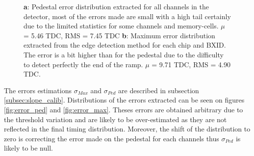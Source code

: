 \documentclass[twoside,a4paper,11pt]{article}
\begin{document}
\begin{appendix}
\begin{figure}[htbp]
	\hfill
	\caption[]{\textbf{a}: Pedestal error distribution extracted for all channels in the detector, most of the errors made are small with a high tail certainly due to the limited statistics for some channels and memory-cells. $\mu$ = 5.46 TDC, RMS = 7.45 TDC \textbf{b}: Maximum error distribution extracted from the edge detection method for each chip and BXID. The error is a bit higher than for the pedestal due to the difficulty to detect perfectly the end of the ramp. $\mu$ = 9.71 TDC, RMS = 4.90 TDC.}
	\label{fig:error_dist}
\end{figure}
The errors estimations $\sigma_{Max}$ and $\sigma_{Ped}$ are described in subsection \ref{subsec:slope_calib}. Distributions of the errors extracted can be seen on figures \ref{fig:error_ped} and \ref{fig:error_max}. Theses errors are obtained arbitrary due to the threshold variation and are likely to be over-estimated as they are not reflected in the final timing distribution. Moreover, the shift of the distribution to zero is correcting the error made on the pedestal for each channels thus $\sigma_{Ped}$ is likely to be null. 
\begin{figure}[htbp]
	\hfill

\end{figure}
\end{appendix}
\end{document}
